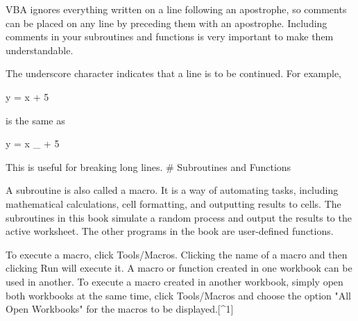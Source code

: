 VBA ignores everything written on a line following an apostrophe, so comments can be placed on any line by preceding them with an apostrophe.  Including comments in your subroutines and functions is very important to make them understandable.  



The underscore character indicates that a line is to be continued. For
example,

    y = x + 5

is the same as

    y = x _
    + 5

This is useful for breaking long lines.
# Subroutines and Functions

A subroutine is also called a macro.  It is a way of automating tasks, including mathematical calculations, cell formatting, and outputting results to cells.  The subroutines in  this book simulate a random process and output the results to the active worksheet.  The other programs in the book are user-defined functions.  

To execute a macro, click Tools/Macros. Clicking the name of a macro and
then clicking Run will execute it. A macro or function created in one
workbook can be used in another. To execute a macro created in another
workbook, simply open both workbooks at the same time, click
Tools/Macros and choose the option "All Open Workbooks" for the macros
to be displayed.[^1]

